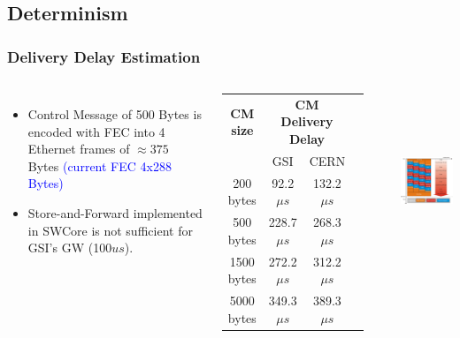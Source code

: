 \documentclass[]{beamer}
\begin{document}
\subsection{Determinism}
\begin{frame}
  \frametitle{Delivery Delay Estimation}   


  \begin{columns}[c]
  \column{2.5in}  %
  \begin{itemize}
  \item Control Message of 500 Bytes is encoded with FEC into 4 Ethernet frames
        of $\approx375$ Bytes \textcolor{blue}{(current FEC 4x288 Bytes)}
  \item Store-and-Forward implemented in SWCore is not sufficient for GSI's GW
        (100$us$).
  \end{itemize}

  {\tiny
  \begin{table}[ht]
  \centering
	  \begin{tabular}{| c | c | c | c |}          \hline
  \textbf{CM size}& \multicolumn{2}{|c|}{\textbf{CM Delivery Delay}}\\
		 &    GSI           & CERN          \\ \hline
  200 bytes      &  92.2$\mu s$    & 132.2$\mu s$    \\ \hline
  500 bytes      & 228.7$\mu s$    & 268.3$\mu s$    \\ \hline
  1500 bytes     & 272.2$\mu s$    & 312.2$\mu s$    \\ \hline
  5000 bytes     & 349.3$\mu s$    & 389.3$\mu s$    \\ \hline
  \end{tabular}
  \label{tab:CMspDelay}
  \end{table}
 }

  \column{3in}

  \includegraphics[height=5.2cm,keepaspectratio]{robustness/CMdelayStandard.pdf}

  \end{columns}



\end{frame}
\end{document}
